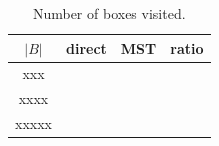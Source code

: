 \begin{table}[bht]
\centering
\begin{tabular}{cccc}\hline
         $|B|$  &  direct & MST & ratio \\ \hline
         xxx & & &  \\  
        xxxx & & &  \\  
       xxxxx & & &  \\  
\hline
\end{tabular}
\caption{Number of boxes visited.\label{count}}
\end{table}
